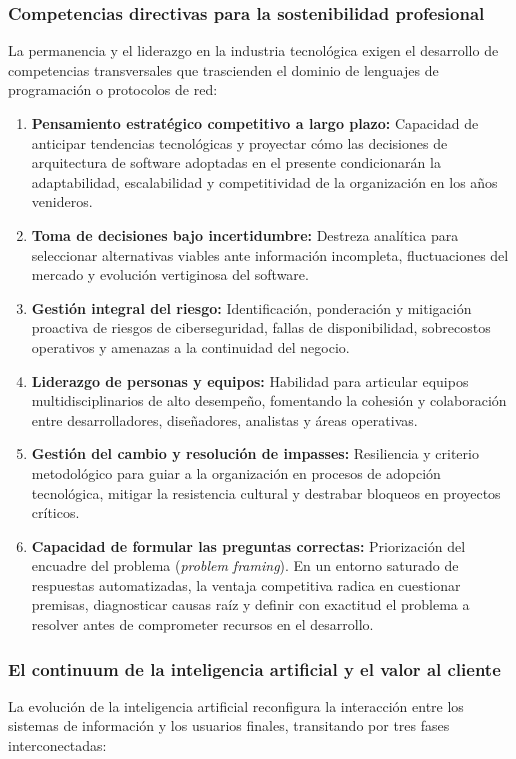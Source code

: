 \subsubsection*{\textcolor{unabblue}{\faUserTie}\quad Competencias directivas para la sostenibilidad profesional}
La permanencia y el liderazgo en la industria tecnológica exigen el desarrollo de competencias transversales que trascienden el dominio de lenguajes de programación o protocolos de red:

\begin{enumerate}
  \item \textbf{Pensamiento estratégico competitivo a largo plazo:} Capacidad de anticipar tendencias tecnológicas y proyectar cómo las decisiones de arquitectura de software adoptadas en el presente condicionarán la adaptabilidad, escalabilidad y competitividad de la organización en los años venideros.
  \item \textbf{Toma de decisiones bajo incertidumbre:} Destreza analítica para seleccionar alternativas viables ante información incompleta, fluctuaciones del mercado y evolución vertiginosa del software.
  \item \textbf{Gestión integral del riesgo:} Identificación, ponderación y mitigación proactiva de riesgos de ciberseguridad, fallas de disponibilidad, sobrecostos operativos y amenazas a la continuidad del negocio.
  \item \textbf{Liderazgo de personas y equipos:} Habilidad para articular equipos multidisciplinarios de alto desempeño, fomentando la cohesión y colaboración entre desarrolladores, diseñadores, analistas y áreas operativas.
  \item \textbf{Gestión del cambio y resolución de impasses:} Resiliencia y criterio metodológico para guiar a la organización en procesos de adopción tecnológica, mitigar la resistencia cultural y destrabar bloqueos en proyectos críticos.
  \item \textbf{Capacidad de formular las preguntas correctas:} Priorización del encuadre del problema (\textit{problem framing}). En un entorno saturado de respuestas automatizadas, la ventaja competitiva radica en cuestionar premisas, diagnosticar causas raíz y definir con exactitud el problema a resolver antes de comprometer recursos en el desarrollo.
\end{enumerate}

\subsubsection*{\textcolor{unabblue}{\faBrain}\quad El continuum de la inteligencia artificial y el valor al cliente}
La evolución de la inteligencia artificial reconfigura la interacción entre los sistemas de información y los usuarios finales, transitando por tres fases interconectadas:

